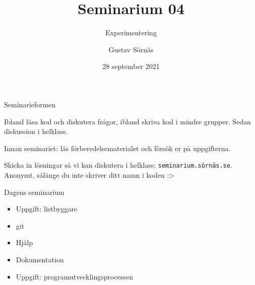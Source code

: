 \documentclass{beamer}
\title{Seminarium 04}
\subtitle{Experimentering}
\date{28 september 2021}
\author{Gustav Sörnäs}
\begin{document}
  \frame{\titlepage}

  \begin{frame}{Seminarieformen}

    Ibland läsa kod och diskutera frågor, ibland skriva kod i mindre grupper.
    Sedan diskussion i helklass.

    Innan seminariet: läs förberedelsematerialet och försök er på uppgifterna.

    Skicka in lösningar så vi kan diskutera i helklass:
    \texttt{seminarium.sörnäs.se}. Anonymt, sålänge du inte skriver ditt namn i
    koden :>

  \end{frame}

  \begin{frame}{Dagens seminarium}

    \begin{itemize}
      \item Uppgift: listbyggare
      \item git
      \item Hjälp
      \item Dokumentation
      \item Uppgift: programutvecklingsprocessen
    \end{itemize}

  \end{frame}

  
\end{document}
